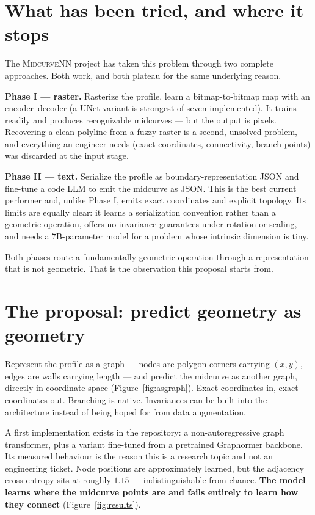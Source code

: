 \documentclass[10pt,twocolumn]{article}
\begin{document}
\section{What has been tried, and where it stops}

The \textsc{MidcurveNN} project has taken this problem through two complete
approaches. Both work, and both plateau for the same underlying reason.

\textbf{Phase I --- raster.} Rasterize the profile, learn a bitmap-to-bitmap
map with an encoder--decoder (a UNet variant is strongest of seven
implemented). It trains readily and produces recognizable midcurves --- but the
output is pixels. Recovering a clean polyline from a fuzzy raster is a second,
unsolved problem, and everything an engineer needs (exact coordinates,
connectivity, branch points) was discarded at the input stage.

\textbf{Phase II --- text.} Serialize the profile as boundary-representation
JSON and fine-tune a code LLM to emit the midcurve as JSON. This is the best
current performer and, unlike Phase I, emits exact coordinates and explicit
topology. Its limits are equally clear: it learns a serialization convention
rather than a geometric operation, offers no invariance guarantees under
rotation or scaling, and needs a 7B-parameter model for a problem whose
intrinsic dimension is tiny.

Both phases route a fundamentally geometric operation through a representation
that is not geometric. That is the observation this proposal starts from.

\section{The proposal: predict geometry as geometry}

Represent the profile as a graph --- nodes are polygon corners carrying
$(x, y)$, edges are walls carrying length --- and predict the midcurve as
another graph, directly in coordinate space (Figure~\ref{fig:asgraph}). Exact
coordinates in, exact coordinates out. Branching is native. Invariances can be
built into the architecture instead of being hoped for from data augmentation.

A first implementation exists in the repository: a non-autoregressive graph
transformer, plus a variant fine-tuned from a pretrained Graphormer backbone.
Its measured behaviour is the reason this is a research topic and not an
engineering ticket. Node positions are approximately learned, but the
adjacency cross-entropy sits at roughly $1.15$ --- indistinguishable from
chance. \textbf{The model learns where the midcurve points are and fails
entirely to learn how they connect} (Figure~\ref{fig:results}).
\end{document}
